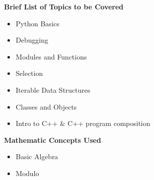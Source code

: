 {    \noindent \textbf{Brief List of Topics to be Covered}
    \begin{itemize}
        \item Python Basics
        \item Debugging
        \item Modules and Functions
        \item Selection
        \item Iterable Data Structures
        \item Classes and Objects
        \item Intro to C++ \& C++ program composition
    \end{itemize}
    
    \noindent \textbf{Mathematic Concepts Used}
    \begin{itemize}
        \item Basic Algebra
        \item Modulo
    \end{itemize}
}

